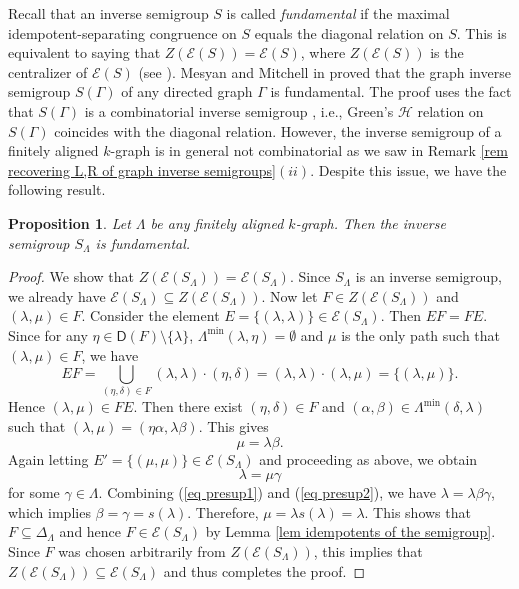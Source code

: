 \documentclass[a4paper,reqno,11pt]{amsart}
\numberwithin{equation}{section}
\newtheorem{prop}[thm]{Proposition}
\theoremstyle{definition}
\theoremstyle{remark}
\begin{document}
Recall that an inverse semigroup $S$ is called \emph{fundamental} if the maximal idempotent-separating congruence on $S$ equals the diagonal relation on $S$. This is equivalent to saying that $Z(\mathcal{E}(S))=\mathcal{E}(S)$, where $Z(\mathcal{E}(S))$ is the centralizer of $\mathcal{E}(S)$ (see \cite[Proposition 2.6]{Ganna}). Mesyan and Mitchell in \cite{Mesyan} proved that the graph inverse semigroup $S(\Gamma)$ of any directed graph $\Gamma$ is fundamental. The proof uses the fact that $S(\Gamma)$ is a combinatorial inverse semigroup \cite{Jones}, i.e., Green's $\mathscr{H}$ relation on $S(\Gamma)$ coincides with the diagonal relation. However, the inverse semigroup of a finitely aligned $k$-graph is in general not combinatorial as we saw in Remark \ref{rem recovering L,R of graph inverse semigroups}$(ii)$. Despite this issue, we have the following result.

\begin{prop}\label{pro S_Lambda is fundamental}
Let $\Lambda$ be any finitely aligned $k$-graph. Then the inverse semigroup $S_\Lambda$ is fundamental. 
\end{prop}
\begin{proof}
We show that $Z(\mathcal{E}(S_\Lambda))=\mathcal{E}(S_\Lambda)$. Since $S_\Lambda$ is an inverse semigroup, we already have $\mathcal{E}(S_\Lambda)\subseteq Z(\mathcal{E}(S_\Lambda))$. Now let $F\in Z(\mathcal{E}(S_\Lambda))$ and $(\lambda,\mu)\in F$. Consider the element $E=\{(\lambda,\lambda)\}\in \mathcal{E}(S_\Lambda)$. Then $EF=FE$. Since for any $\eta\in \mathsf{D}(F)\setminus \{\lambda\}$, $\Lambda^{\min}(\lambda,\eta)=\emptyset$ and $\mu$ is the only path such that $(\lambda,\mu)\in F$, we have \[EF=\displaystyle{\bigcup_{(\eta,\delta)\in F}}(\lambda,\lambda)\cdot (\eta,\delta)=(\lambda,\lambda)\cdot (\lambda,\mu)=\{(\lambda,\mu)\}.\] Hence $(\lambda,\mu)\in FE$. Then there exist $(\eta,\delta)\in F$ and $(\alpha,\beta)\in \Lambda^{\min}(\delta,\lambda)$ such that $(\lambda,\mu)=(\eta\alpha,\lambda\beta)$. This gives 
\begin{equation}\label{eq presup1}
\mu=\lambda\beta.    
\end{equation}
Again letting $E'=\{(\mu,\mu)\}\in \mathcal{E}(S_\Lambda)$ and proceeding as above, we obtain 
\begin{equation}\label{eq presup2}
\lambda=\mu\gamma    
\end{equation}
for some $\gamma\in \Lambda$. Combining (\ref{eq presup1}) and (\ref{eq presup2}), we have $\lambda=\lambda\beta\gamma$, which implies $\beta=\gamma=s(\lambda)$. Therefore, $\mu=\lambda s(\lambda)=\lambda$. This shows that $F\subseteq \Delta_{\Lambda}$ and hence $F\in \mathcal{E}(S_\Lambda)$ by Lemma \ref{lem idempotents of the semigroup}. Since $F$ was chosen arbitrarily from $Z(\mathcal{E}(S_\Lambda))$, this implies that $Z(\mathcal{E}(S_\Lambda))\subseteq \mathcal{E}(S_\Lambda)$ and thus completes the proof. 
\end{proof}
\end{document}
